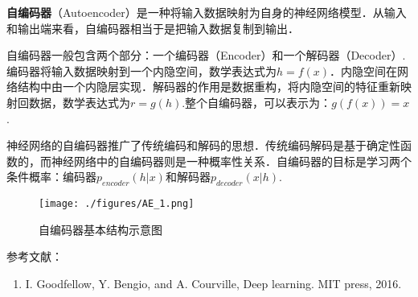 
\textbf{自编码器}（Autoencoder）是一种将输入数据映射为自身的神经网络模型．从输入和输出端来看，自编码器相当于是把输入数据复制到输出．

自编码器一般包含两个部分：一个编码器（Encoder）和一个解码器（Decoder）.编码器将输入数据映射到一个内隐空间，数学表达式为$h=f(x)$．内隐空间在网络结构中由一个内隐层实现．解码器的作用是数据重构，将内隐空间的特征重新映射回数据，数学表达式为$r=g(h)$.整个自编码器，可以表示为：$g(f(x))=x$.

神经网络的自编码器推广了传统编码和解码的思想．传统编码解码是基于确定性函数的，而神经网络中的自编码器则是一种概率性关系．自编码器的目标是学习两个条件概率：编码器$p_{encoder}(h|x)$和解码器$p_{decoder}(x|h)$.

\begin{figure}[ht]
\centering
\texttt{[image: ./figures/AE\_1.png]}
\caption{自编码器基本结构示意图} \label{AE_fig1}
\end{figure}


参考文献：
\begin{enumerate}
\item I. Goodfellow, Y. Bengio, and A. Courville, Deep learning. MIT press, 2016.
\end{enumerate}
